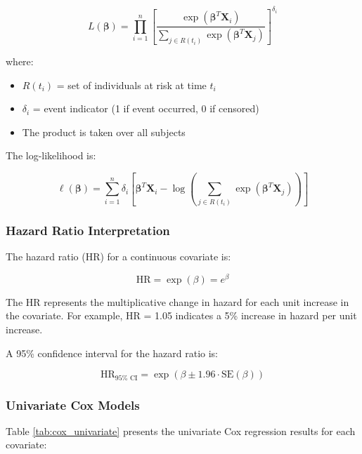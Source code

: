 \documentclass[12pt,a4paper]{article}
\begin{document}
\begin{equation}
L(\boldsymbol{\beta}) = \prod_{i=1}^{n} \left[\frac{\exp(\boldsymbol{\beta}^T \mathbf{X}_i)}{\sum_{j \in R(t_i)} \exp(\boldsymbol{\beta}^T \mathbf{X}_j)}\right]^{\delta_i}
\label{eq:partial_likelihood}
\end{equation}

where:
\begin{itemize}
    \item \(R(t_i)\) = set of individuals at risk at time \(t_i\)
    \item \(\delta_i\) = event indicator (1 if event occurred, 0 if censored)
    \item The product is taken over all subjects
\end{itemize}

The log-likelihood is:

\begin{equation}
\ell(\boldsymbol{\beta}) = \sum_{i=1}^{n} \delta_i \left[\boldsymbol{\beta}^T \mathbf{X}_i - \log\left(\sum_{j \in R(t_i)} \exp(\boldsymbol{\beta}^T \mathbf{X}_j)\right)\right]
\label{eq:log_likelihood}
\end{equation}

\subsubsection{Hazard Ratio Interpretation}

The hazard ratio (HR) for a continuous covariate is:

\begin{equation}
\text{HR} = \exp(\beta) = e^{\beta}
\label{eq:hazard_ratio}
\end{equation}

The HR represents the multiplicative change in hazard for each unit increase in the covariate. For example, HR = 1.05 indicates a 5\% increase in hazard per unit increase.

A 95\% confidence interval for the hazard ratio is:

\begin{equation}
\text{HR}_{95\% \text{ CI}} = \exp(\beta \pm 1.96 \cdot \text{SE}(\beta))
\label{eq:hr_ci}
\end{equation}

\subsubsection{Univariate Cox Models}

Table \ref{tab:cox_univariate} presents the univariate Cox regression results for each covariate:
\end{document}
